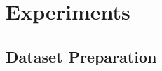 



\section{Experiments}
\label{sec:evaluation}

\subsection{Dataset Preparation} \label{subsec:data-preparation}

